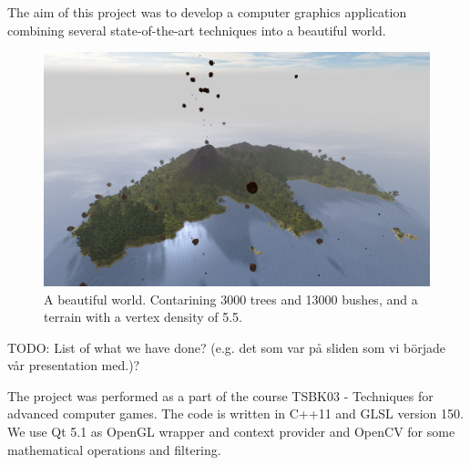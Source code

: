 The aim of this project was to develop a computer graphics application combining several state-of-the-art techniques into a beautiful world. 
\begin{figure}[H]
  \centering
  \includegraphics[width=1.0\linewidth]{images/frontImage.jpg}
  \caption{A beautiful world. Contarining 3000 trees and 13000 bushes, and a terrain with a vertex density of 5.5.}
  \label{fig:beautifulIsland}
\end{figure}%

TODO: List of what we have done? (e.g. det som var på sliden som vi började vår presentation med.)?


The project was performed as a part of the course TSBK03 - Techniques for advanced computer games. The code is written in C++11 and GLSL version 150. We use Qt 5.1 as OpenGL wrapper and context provider and OpenCV for some mathematical operations and filtering.